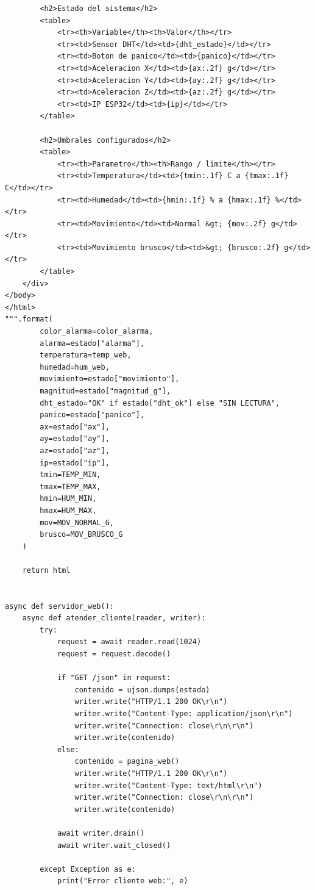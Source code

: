 \documentclass[12pt]{article}
\begin{document}
\begin{lstlisting}
        <h2>Estado del sistema</h2>
        <table>
            <tr><th>Variable</th><th>Valor</th></tr>
            <tr><td>Sensor DHT</td><td>{dht_estado}</td></tr>
            <tr><td>Boton de panico</td><td>{panico}</td></tr>
            <tr><td>Aceleracion X</td><td>{ax:.2f} g</td></tr>
            <tr><td>Aceleracion Y</td><td>{ay:.2f} g</td></tr>
            <tr><td>Aceleracion Z</td><td>{az:.2f} g</td></tr>
            <tr><td>IP ESP32</td><td>{ip}</td></tr>
        </table>

        <h2>Umbrales configurados</h2>
        <table>
            <tr><th>Parametro</th><th>Rango / limite</th></tr>
            <tr><td>Temperatura</td><td>{tmin:.1f} C a {tmax:.1f} C</td></tr>
            <tr><td>Humedad</td><td>{hmin:.1f} % a {hmax:.1f} %</td></tr>
            <tr><td>Movimiento</td><td>Normal &gt; {mov:.2f} g</td></tr>
            <tr><td>Movimiento brusco</td><td>&gt; {brusco:.2f} g</td></tr>
        </table>
    </div>
</body>
</html>
""".format(
        color_alarma=color_alarma,
        alarma=estado["alarma"],
        temperatura=temp_web,
        humedad=hum_web,
        movimiento=estado["movimiento"],
        magnitud=estado["magnitud_g"],
        dht_estado="OK" if estado["dht_ok"] else "SIN LECTURA",
        panico=estado["panico"],
        ax=estado["ax"],
        ay=estado["ay"],
        az=estado["az"],
        ip=estado["ip"],
        tmin=TEMP_MIN,
        tmax=TEMP_MAX,
        hmin=HUM_MIN,
        hmax=HUM_MAX,
        mov=MOV_NORMAL_G,
        brusco=MOV_BRUSCO_G
    )

    return html


async def servidor_web():
    async def atender_cliente(reader, writer):
        try:
            request = await reader.read(1024)
            request = request.decode()

            if "GET /json" in request:
                contenido = ujson.dumps(estado)
                writer.write("HTTP/1.1 200 OK\r\n")
                writer.write("Content-Type: application/json\r\n")
                writer.write("Connection: close\r\n\r\n")
                writer.write(contenido)
            else:
                contenido = pagina_web()
                writer.write("HTTP/1.1 200 OK\r\n")
                writer.write("Content-Type: text/html\r\n")
                writer.write("Connection: close\r\n\r\n")
                writer.write(contenido)

            await writer.drain()
            await writer.wait_closed()

        except Exception as e:
            print("Error cliente web:", e)


\end{lstlisting}
\end{document}
